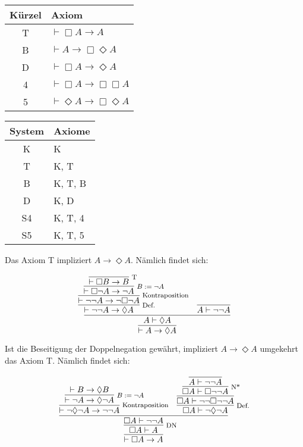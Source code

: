 \documentclass[8pt]{beamer}
\newcommand{\strong}[1]{\textsf{\textbf{#1}}}
\newcommand{\infernote}[1]{\!\text{\footnotesize #1}}
\newcommand{\cond}{\rightarrow}
\newcommand{\lnec}{\Box}
\newcommand{\lpos}{\Diamond}
\begin{document}
\begin{frame}
\begin{center}
\begin{tabular}{cl}
\toprule
\strong{Kürzel} & \strong{Axiom}\\
\midrule[\heavyrulewidth]
T & $\vdash\lnec A\cond A$\\
B & $\vdash A\cond\lnec\lpos A$\\
D & $\vdash\lnec A\cond\lpos A$\\
4 & $\vdash\lnec A\cond\lnec\lnec A$\\
5 & $\vdash\lpos A\cond\lnec\lpos A$\\
\bottomrule
\end{tabular}
\end{center}

\begin{center}
\begin{tabular}{cl}
\toprule
\strong{System} & \strong{Axiome}\\
\midrule[\heavyrulewidth]
K & K\\
T & K, T\\
B & K, T, B\\
D & K, D\\
S4 & K, T, 4\\
S5 & K, T, 5\\
\bottomrule
\end{tabular}
\end{center}
\end{frame}

\begin{frame}
Das Axiom T impliziert $A\cond\lpos A$. Nämlich findet sich:

\[
\infer{\vdash A\cond\lpos A}{
  \infer{A\vdash\lpos A}{
    \infer[\infernote{Def.}]{\vdash\neg\neg A\cond\lpos A}{
      \infer[\infernote{Kontraposition}]{\vdash\neg\neg A\cond\neg\lnec\neg A}{
        \infer[\infernote{$B:=\neg A$}]{\vdash\lnec\neg A\cond\neg A}{
          \infer[\infernote{T}]{\vdash\lnec B\cond B}{}}}}
  & \infer{A\vdash\neg\neg A}{}}}
\]\pause

Ist die Beseitigung der Doppelnegation gewährt, impliziert
$A\cond\lpos A$ umgekehrt das Axiom T. Nämlich findet sich:

\[
\infer{\vdash\lnec A\cond A}{
  \infer[\infernote{DN}]{\lnec A\vdash A}{
    \infer{\lnec A\vdash\neg\neg A}{
      \infer[\infernote{Kontraposition}]{\vdash\neg\lpos\neg A\cond\neg\neg A}{
        \infer[\infernote{$B:=\neg A$}]{\vdash\neg A\cond\lpos\neg A}{
          \vdash B\cond\lpos B}}
    & \infer[\infernote{Def.}]{\lnec A\vdash\neg\lpos\neg A}{
        \infer{\lnec A\vdash\neg\neg\lnec\neg\neg A}{
          \infer[\infernote{N*}]{\lnec A\vdash\lnec\neg\neg A}{
            \infer{A\vdash\neg\neg A}{}}}}}}}
\]
\end{frame}
\end{document}
